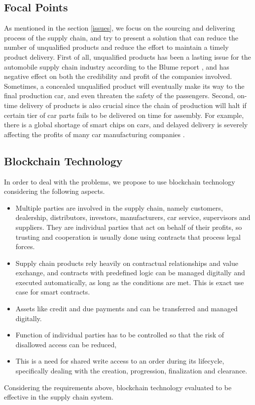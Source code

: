 \documentclass[12pt]{article}
\begin{document}
\subsection{Focal Points}
As mentioned in the section \ref{issues}, we focus on the sourcing and delivering process of the supply chain, and try to present a solution that can reduce the number of unqualified products and reduce the effort to maintain a timely product delivery. First of all, unqualified products has been a lasting issue for the automobile supply chain industry according to the Blume report \cite{blume}, and has negative effect on both the credibility and profit of the companies involved. Sometimes, a concealed unqualified product will eventually make its way to the final production car, and even threaten the safety of the passengers. Second, on-time delivery of products is also crucial since the chain of production will halt if certain tier of car parts fails to be delivered on time for assembly. For example, there is a global shortage of smart chips on cars, and delayed delivery is severely affecting the profits of many car manufacturing companies \cite{shortage}.

\subsection{Blockchain Technology}
In order to deal with the problems, we propose to use blockchain technology considering the following aspects.
\begin{itemize}
    \item Multiple parties are involved in the supply chain, namely customers, dealership, distributors, investors, manufacturers, car service, supervisors and suppliers. They are individual parties that act on behalf of their profits, so trusting and cooperation is usually done using contracts that process legal forces.
    \item Supply chain products rely heavily on contractual relationships and value exchange, and contracts with predefined logic can be managed digitally and executed automatically, as long as the conditions are met. This is exact use case for smart contracts.
    \item Assets like credit and due payments and can be transferred and managed digitally.
    \item Function of individual parties has to be controlled so that the risk of disallowed access can be reduced,
    \item This is a need for shared write access to an order during its lifecycle, specifically dealing with the creation, progression, finalization and clearance.
\end{itemize}
Considering the requirements above, blockchain technology evaluated to be effective in the supply chain system.
\end{document}

